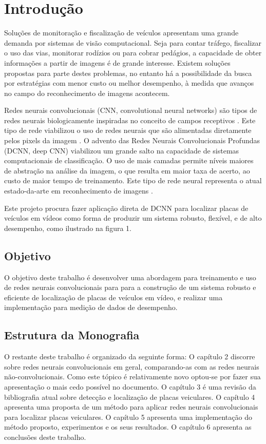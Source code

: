 
\chapter{Introdução}

Soluções de monitoração e fiscalização de veículos apresentam
uma grande demanda por sistemas de visão computacional. Seja
para contar tráfego, fiscalizar o uso das vias, monitorar
rodízios ou para cobrar pedágios, a capacidade de obter
informações a partir de imagens é de grande interesse. Existem
soluções propostas para parte destes problemas, no entanto há a
possibilidade da busca por estratégias com menor custo ou melhor
desempenho, à medida que avanços no campo do reconhecimento de
imagens acontecem.

Redes neurais convolucionais (CNN, convolutional neural networks)
são tipos de redes neurais biologicamente inspiradas no conceito
de campos receptivos \cite{hubel1968receptive}. Este tipo de
rede viabilizou o uso de redes neurais que são alimentadas
diretamente pelos pixels da imagem \cite{lecun1998gradient}. O
advento das Redes Neurais Convolucionais Profundas (DCNN, deep CNN)
viabilizou um grande salto na capacidade de sistemas computacionais
de classificação. O uso de mais camadas permite níveis maiores de
abstração na análise da imagem, o que resulta em maior taxa de
acerto, ao custo de maior tempo de treinamento. Este tipo de rede
neural representa o atual estado-da-arte em reconhecimento de
imagens \cite{szegedy2015going}.

Este projeto procura fazer aplicação direta de DCNN para localizar
placas de veículos em vídeos como forma de produzir um sistema
robusto, flexível, e de alto desempenho, como ilustrado na figura 1.

\section{Objetivo}
O objetivo deste trabalho é desenvolver uma abordagem para
treinamento e uso de redes neurais convolucionais para para a
construção de um sistema robusto e eficiente de localização de
placas de veículos em vídeo, e realizar uma implementação para
medição de dados de desempenho.

\section{Estrutura da Monografia}
O restante deste trabalho é organizado da seguinte forma: O
capítulo 2 discorre sobre redes neurais convolucionais em geral,
comparando-as com as redes neurais não-convolucionais. Como este
tópico é relativamente novo optou-se por fazer sua apresentação
o mais cedo possível no documento. O capítulo 3 é uma revisão da
bibliografia atual sobre detecção e localização de placas veiculares. O
capítulo 4 apresenta uma proposta de um método para aplicar redes neurais
convolucionais para localizar placas veiculares. O capítulo 5 apresenta uma
implementação do método proposto, experimentos e os seus resultados. O
capítulo 6 apresenta as conclusões deste trabalho.

